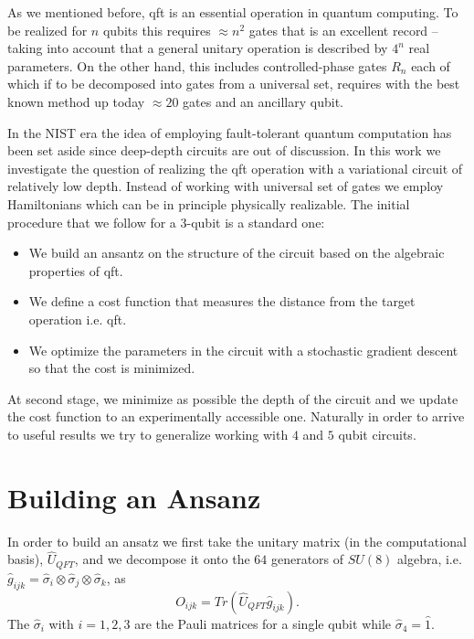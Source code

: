 \documentclass[inscr,ack,preface]{diphdthesis}
\begin{document}
\label{chap:qft_vqc}

As we mentioned before, \acrshort{qft} is an essential operation in quantum computing. To be realized for $n$ \acrshort{qubit}s this requires 
$\approx n^2$ gates that is an excellent record --taking into account that a general unitary operation
is described by $4^n$ real parameters. On the other hand, this includes controlled-phase gates $R_n$
each of which if to be decomposed into gates from a universal set, requires with the best known
method up today $\approx 20$ gates and an ancillary \acrshort{qubit}. 

In the NIST era the idea of employing fault-tolerant quantum computation has been set aside
since deep-depth circuits are out of discussion. In this work we investigate the question
of realizing the \acrshort{qft} operation with a variational circuit of relatively low depth. Instead of
working with universal set of gates we employ Hamiltonians which can be in principle physically realizable.
 The initial procedure that we follow for a $3$-\acrshort{qubit} is a standard one:
\begin{itemize}
	\item We build an ansantz on the structure of the circuit based on the algebraic properties of \acrshort{qft}.
	\item We define a cost function that measures the distance from the target operation i.e. \acrshort{qft}.
	\item We optimize the parameters in the circuit with a stochastic gradient descent so that the cost is minimized. 
\end{itemize}
At second stage, we minimize as possible the depth of the circuit and we update the cost function to an experimentally accessible one.
Naturally in order to arrive to useful results we try to generalize working with $4$ and $5$ \acrshort{qubit} circuits.
  
\section{Building an Ansanz} 

In order to build an ansatz we first take the unitary matrix (in the computational basis), $\hat{U}_{QFT}$,
and we decompose it onto the $64$ generators of $SU(8)$ algebra, i.e. $\hat{g}_{ijk}=\hat{\sigma}_{i} \otimes \hat{\sigma}_{j} \otimes \hat{\sigma}_{k}$,
as 
\begin{equation}
O_{ijk}=Tr\left(\hat{U}_{QFT} \hat{g}_{ijk} \right).
\end{equation}
The $\hat{\sigma}_{i}$ with $i=1,2,3$ are the Pauli matrices for a single \acrshort{qubit} while $\hat{\sigma}_{4}=\hat{1}$.
\end{document}
